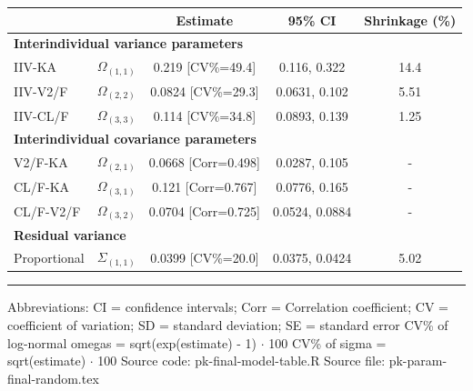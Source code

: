 \setlength{\tabcolsep}{5pt} 
\begin{threeparttable}
\renewcommand{\arraystretch}{1.3}
\begin{tabular}[h]{lcccc}
\hline
 &  & Estimate & 95\% CI & Shrinkage (\%) \\
\hline
\multicolumn{5}{l}{\textbf{Interindividual variance parameters}}\\%
IIV-KA & $\Omega_{(1,1)}$ & 0.219 [CV\%=49.4] & 0.116, 0.322 & 14.4 \\
IIV-V2/F & $\Omega_{(2,2)}$ & 0.0824 [CV\%=29.3] & 0.0631, 0.102 & 5.51 \\
IIV-CL/F & $\Omega_{(3,3)}$ & 0.114 [CV\%=34.8] & 0.0893, 0.139 & 1.25 \\
\hline \multicolumn{5}{l}{\textbf{Interindividual covariance parameters}}\\%
V2/F-KA & $\Omega_{(2,1)}$ & 0.0668 [Corr=0.498] & 0.0287, 0.105 & - \\
CL/F-KA & $\Omega_{(3,1)}$ & 0.121 [Corr=0.767] & 0.0776, 0.165 & - \\
CL/F-V2/F & $\Omega_{(3,2)}$ & 0.0704 [Corr=0.725] & 0.0524, 0.0884 & - \\
\hline \multicolumn{5}{l}{\textbf{Residual variance}}\\%
Proportional & $\Sigma_{(1,1)}$ & 0.0399 [CV\%=20.0] & 0.0375, 0.0424 & 5.02 \\
\hline
\end{tabular}
\end{threeparttable}
 
\vspace{0.67cm}
 
\begin{minipage}{1\linewidth}
\linespread{1.1}\selectfont
\rule{1\linewidth}{0.4pt}
\vspace{0.02cm}
Abbreviations: CI = confidence intervals; 
                        Corr = Correlation coefficient;
                        CV = coefficient of variation;
                        SD = standard deviation;
                        SE = standard error \newline
CV\% of log-normal omegas = sqrt(exp(estimate) - 1) $\cdot$ 100 \newline
CV\% of sigma = sqrt(estimate) $\cdot$ 100 \newline
Source code: pk-final-model-table.R \newline
Source file: pk-param-final-random.tex \newline
\end{minipage}
